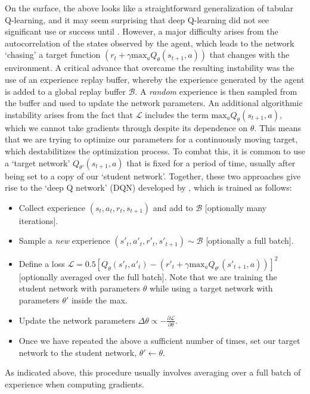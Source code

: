 On the surface, the above looks like a straightforward generalization of tabular Q-learning, and it may seem surprising that deep Q-learning did not see significant use or success until \citet{mnih2013playing}.
However, a major difficulty arises from the autocorrelation of the states observed by the agent, which leads to the network `chasing' a target function $(r_t + \gamma \text{max}_a Q_\theta(s_{t+1}, a))$ that changes with the environment.
A critical advance that overcame the resulting instability was the use of an experience replay buffer, whereby the experience generated by the agent is added to a global replay buffer $\mathcal{B}$.
A \emph{random} experience is then sampled from the buffer and used to update the network parameters.
An additional algorithmic instability arises from the fact that $\mathcal{L}$ includes the term $\text{max}_a Q_\theta(s_{t+1}, a)$, which we cannot take gradients through despite its dependence on $\theta$.
This means that we are trying to optimize our parameters for a continuously moving target, which destabilitizes the optimization process.
To combat this, it is common to use a `target network' $Q_{\theta'}(s_{t+1}, a)$ that is fixed for a period of time, usually after being set to a copy of our `student network'.
Together, these two approaches give rise to the `deep Q network' (DQN) developed by \citet{mnih2013playing}, which is trained as follows:
\begin{itemize}
    \item Collect experience $(s_t, a_t, r_t, s_{t+1})$ and add to $\mathcal{B}$ [optionally many iterations].
    \item Sample a \emph{new} experience $(s'_t, a'_t, r'_t, s'_{t+1}) \sim \mathcal{B}$ [optionally a full batch].
    \item Define a loss $\mathcal{L} = 0.5 [ Q_\theta(s'_t, a'_t) - (r'_t + \gamma \text{max}_a Q_{\theta'}(s'_{t+1}, a)) ]^2 $ [optionally averaged over the full batch]. Note that we are training the student network with parameters $\theta$ while using a target network with parameters $\theta'$ inside the max.
    \item Update the network parameters $\Delta \theta \propto - \frac{\partial \mathcal{L}}{\partial \theta}$.
    \item Once we have repeated the above a sufficient number of times, set our target network to the student network, $\theta' \leftarrow \theta$.
\end{itemize}
As indicated above, this procedure usually involves averaging over a full batch of experience when computing gradients.
